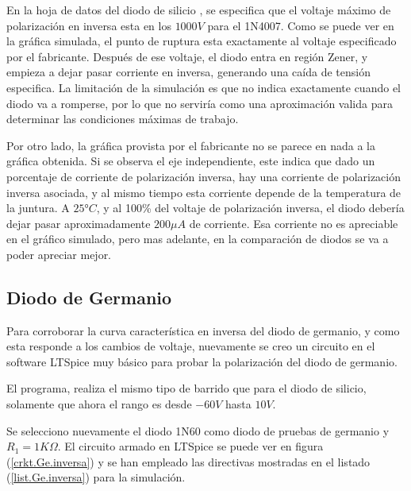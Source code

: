 \documentclass[chaptersright]{informeutn}
\begin{document}
        En la hoja de datos del diodo de silicio \cite{DS0}, se especifica que el voltaje máximo de polarización en
        inversa esta en los $1000V$ para el 1N4007. Como se puede ver en la gráfica simulada, el punto de ruptura esta
        exactamente al voltaje especificado por el fabricante. Después de ese voltaje, el diodo entra en región Zener,
        y empieza a dejar pasar corriente en inversa, generando una caída de tensión especifica. La limitación de la
        simulación es que no indica exactamente cuando el diodo va a romperse, por lo que no serviría como una
        aproximación valida para determinar las condiciones máximas de trabajo.

        Por otro lado, la gráfica provista por el fabricante no se parece en nada a la gráfica obtenida. Si se observa
        el eje independiente, este indica que dado un porcentaje de corriente de polarización inversa, hay una
        corriente de polarización inversa asociada, y al mismo tiempo esta corriente depende de la temperatura de la
        juntura. A $25°C$, y al 100\% del voltaje de polarización inversa, el diodo debería dejar pasar aproximadamente
        $200\mu A$ de corriente. Esa corriente no es apreciable en el gráfico simulado, pero mas adelante, en la
        comparación de diodos se va a poder apreciar mejor.

      \subsection{Diodo de Germanio}
        Para corroborar la curva característica en inversa del diodo de germanio, y como esta responde a los cambios de
        voltaje, nuevamente se creo un circuito en el software LTSpice muy básico para probar la polarización del diodo
        de germanio.

        El programa, realiza el mismo tipo de barrido que para el diodo de silicio, solamente que ahora el rango es
        desde $-60V$ hasta $10V$.

        Se selecciono nuevamente el diodo 1N60 como diodo de pruebas de germanio y $R_1 = 1K\Omega$. El circuito
        armado en LTSpice se puede ver en figura (\ref{crkt.Ge.inversa}) y se han empleado las directivas mostradas
        en el listado (\ref{list.Ge.inversa}) para la simulación.
\end{document}
